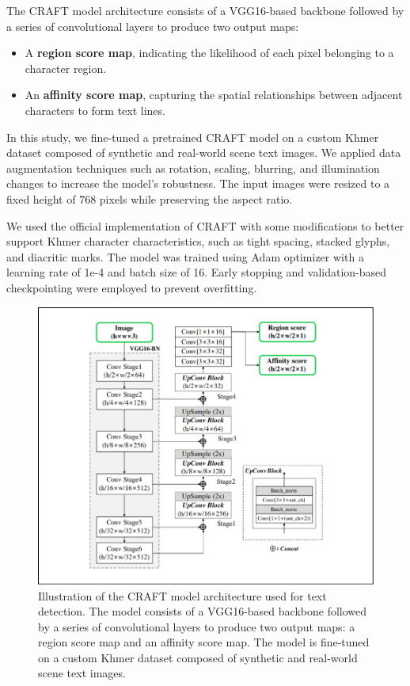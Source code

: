 The CRAFT model architecture consists of a VGG16-based backbone followed by a series 
of convolutional layers to produce two output maps:
\begin{itemize}
\item A \textbf{region score map}, indicating the likelihood of each pixel belonging 
to a character region.
\item An \textbf{affinity score map}, capturing the spatial relationships between 
adjacent characters to form text lines.
\end{itemize}

In this study, we fine-tuned a pretrained CRAFT model on a custom Khmer dataset 
composed of synthetic and real-world scene text images. We applied data augmentation 
techniques such as rotation, scaling, blurring, and illumination changes to increase 
the model's robustness. The input images were resized to a fixed height of 768 pixels 
while preserving the aspect ratio.

We used the official implementation of CRAFT with some modifications to better support
Khmer character characteristics, such as tight spacing, stacked glyphs, and diacritic 
marks. The model was trained using Adam optimizer with a learning rate of 1e-4 and batch 
size of 16. Early stopping and validation-based checkpointing were employed to 
prevent overfitting.

\begin{figure}[ht]
    \centering
    \includegraphics[width=\textwidth]{figures/craft_model.png}
    \caption{Illustration of the CRAFT model architecture used for text detection. 
    The model consists of a VGG16-based backbone followed by a series of 
    convolutional layers to produce two output maps: a region score map and 
    an affinity score map. The model is fine-tuned on a custom Khmer dataset 
    composed of synthetic and real-world scene text images. \cite{baek2019craft}}
    \label{fig:craft-model}
\end{figure}


